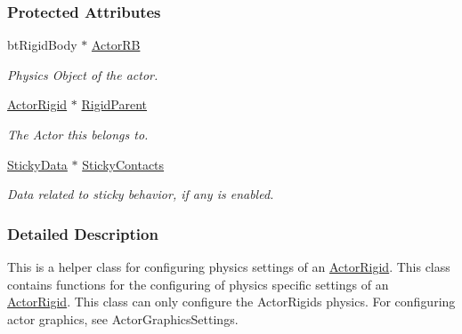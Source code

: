 \subsubsection*{Protected Attributes}
\begin{DoxyCompactItemize}
\item 
\hypertarget{classMezzanine_1_1ActorRigidPhysicsSettings_a6b8383d096105187418886ac0f28daf3}{
btRigidBody $\ast$ \hyperlink{classMezzanine_1_1ActorRigidPhysicsSettings_a6b8383d096105187418886ac0f28daf3}{ActorRB}}
\label{classMezzanine_1_1ActorRigidPhysicsSettings_a6b8383d096105187418886ac0f28daf3}

\begin{DoxyCompactList}\small\item\em Physics Object of the actor. \item\end{DoxyCompactList}\item 
\hypertarget{classMezzanine_1_1ActorRigidPhysicsSettings_ac83840161a9a88ecdcbacfa3c204bd6e}{
\hyperlink{classMezzanine_1_1ActorRigid}{ActorRigid} $\ast$ \hyperlink{classMezzanine_1_1ActorRigidPhysicsSettings_ac83840161a9a88ecdcbacfa3c204bd6e}{RigidParent}}
\label{classMezzanine_1_1ActorRigidPhysicsSettings_ac83840161a9a88ecdcbacfa3c204bd6e}

\begin{DoxyCompactList}\small\item\em The Actor this belongs to. \item\end{DoxyCompactList}\item 
\hypertarget{classMezzanine_1_1ActorRigidPhysicsSettings_a8ddca7ae371cae162657763543f970bb}{
\hyperlink{structMezzanine_1_1StickyData}{StickyData} $\ast$ \hyperlink{classMezzanine_1_1ActorRigidPhysicsSettings_a8ddca7ae371cae162657763543f970bb}{StickyContacts}}
\label{classMezzanine_1_1ActorRigidPhysicsSettings_a8ddca7ae371cae162657763543f970bb}

\begin{DoxyCompactList}\small\item\em Data related to sticky behavior, if any is enabled. \item\end{DoxyCompactList}\end{DoxyCompactItemize}


\subsubsection{Detailed Description}
This is a helper class for configuring physics settings of an \hyperlink{classMezzanine_1_1ActorRigid}{ActorRigid}. This class contains functions for the configuring of physics specific settings of an \hyperlink{classMezzanine_1_1ActorRigid}{ActorRigid}. This class can only configure the ActorRigids physics. For configuring actor graphics, see ActorGraphicsSettings. 

